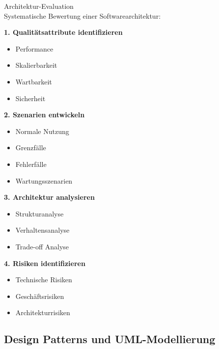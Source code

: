 \begin{KR}{Architektur-Evaluation}\\
Systematische Bewertung einer Softwarearchitektur:

\textbf{1. Qualitätsattribute identifizieren}
\begin{itemize}
    \item Performance
    \item Skalierbarkeit
    \item Wartbarkeit
    \item Sicherheit
\end{itemize}

\textbf{2. Szenarien entwickeln}
\begin{itemize}
    \item Normale Nutzung
    \item Grenzfälle
    \item Fehlerfälle
    \item Wartungsszenarien
\end{itemize}

\textbf{3. Architektur analysieren}
\begin{itemize}
    \item Strukturanalyse
    \item Verhaltensanalyse
    \item Trade-off Analyse
\end{itemize}

\textbf{4. Risiken identifizieren}
\begin{itemize}
    \item Technische Risiken
    \item Geschäftsrisiken
    \item Architekturrisiken
\end{itemize}
\end{KR}




\raggedcolumns
\pagebreak

\subsection{Design Patterns und UML-Modellierung}

